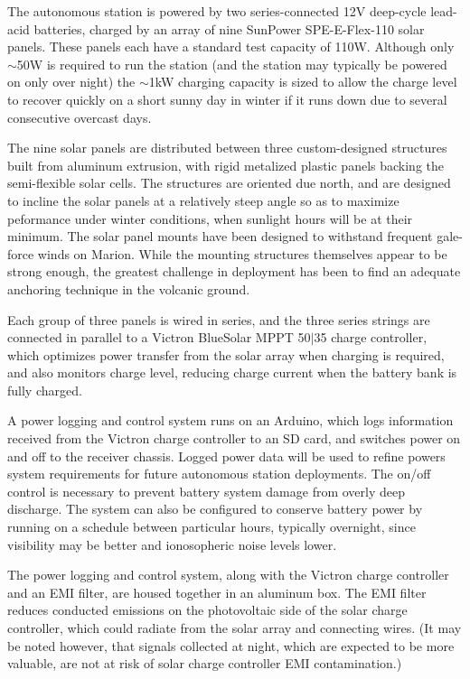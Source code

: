 \documentclass{ws-jai}
\begin{document}
The autonomous station is powered by two series-connected 12V deep-cycle lead-acid batteries, charged by an array of nine  SunPower SPE-E-Flex-110 solar panels. These panels each have a standard test capacity of 110W. Although only $\sim$50W is required to run the station (and the station may typically be powered on only over night) the $\sim$1kW charging capacity is sized to allow the charge level to recover quickly on a short sunny day in winter if it runs down due to several consecutive overcast days. 

The nine solar panels are distributed between three custom-designed structures built from aluminum extrusion, with rigid metalized plastic panels backing the semi-flexible solar cells. The structures are oriented due north, and are designed to incline the solar panels at a relatively steep angle so as to maximize peformance under winter conditions, when sunlight hours will be at their minimum. The solar panel mounts have been designed to withstand frequent gale-force winds on Marion. While the mounting structures themselves appear to be strong enough, the greatest challenge in deployment has been to find an adequate anchoring technique in the volcanic ground.

Each group of three panels is wired in series, and the three series strings are connected in parallel to a Victron BlueSolar MPPT 50$\vert$35 charge controller, which optimizes power transfer from the solar array when charging is required, and also monitors charge level, reducing charge current when the battery bank is fully charged.

A power logging and control system runs on an Arduino, which logs information received from the Victron charge controller to an SD card, and switches power on and off to the receiver chassis. Logged power data will be used to refine powers system requirements for future autonomous station deployments. The on/off control is necessary to prevent battery system  damage from overly deep discharge. The system can also be configured to conserve battery power by running on a schedule between particular hours, typically overnight, since visibility may be better and ionosopheric noise levels lower.

The power logging and control system, along with the Victron charge controller and an EMI filter, are housed together in an aluminum box. The EMI filter reduces conducted emissions on the photovoltaic side of the solar charge controller, which could radiate from the solar array and connecting wires. (It may be noted however, that signals collected at night, which are expected to be more valuable, are not at risk of solar charge controller EMI contamination.)
\end{document}
